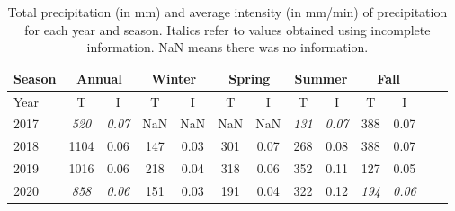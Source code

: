 \begin{table}[t]
  \begin{center}
    \begin{tabular}{|l|*{11}{c|}r|}
      \hline
      Season    &       \multicolumn{2}{|c|}{Annual}          & \multicolumn{2}{|c|}{Winter}& \multicolumn{2}{|c|}{Spring}  & \multicolumn{2}{|c|}{Summer} &\multicolumn{2}{|c|}{Fall}  \\
      \hline
      Year      & T & I  & T & I  & T & I  & T & I  & T & I \\
      \hline
      2017      & \textit{520}  & \textit{0.07}  & NaN & NaN & NaN & NaN & \textit{131}  & \textit{0.07}  & 388  & 0.07  \\
      2018      & 1104           & 0.06  & 147 & 0.03 & 301 & 0.07 & 268  & 0.08  & 388 & 0.07  \\
      2019      & 1016           & 0.06  & 218  & 0.04 & 318 & 0.06 & 352 & 0.11  & 127 &  0.05 \\
      2020      & \textit{858}           & \textit{0.06}   & 151  & 0.03 & 191  & 0.04 & 322  & 0.12 & \textit{194} & \textit{0.06}\\
      \hline
    \end{tabular}
  \end{center}
  \caption[Summary of total precipitation and
    intensity]{\label{secondtable}Total precipitation (in mm) and average
    intensity (in mm/min) of precipitation for each year and season. Italics
    refer to values obtained using incomplete information. NaN means there
    was no information.}
\end{table}
